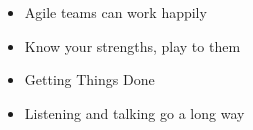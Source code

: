 
  \begin{itemize}
    \setlength\itemsep{-0.3em}
  
\item 
Agile teams can work happily 
% 
\item 
Know your strengths, play to them 
% 
\item 
Getting Things Done 
% 
\item 
Listening and talking go a long way 
% 
\end{itemize}
 
% 
% 
% 
% 


